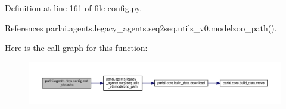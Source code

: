 Definition at line 161 of file config.\+py.



References parlai.\+agents.\+legacy\+\_\+agents.\+seq2seq.\+utils\+\_\+v0.\+modelzoo\+\_\+path().

Here is the call graph for this function\+:
\nopagebreak
\begin{figure}[H]
\begin{center}
\leavevmode
\includegraphics[width=350pt]{namespaceparlai_1_1agents_1_1drqa_1_1config_a8cc825bafeff299794cba6e2a8b65da2_cgraph}
\end{center}
\end{figure}
